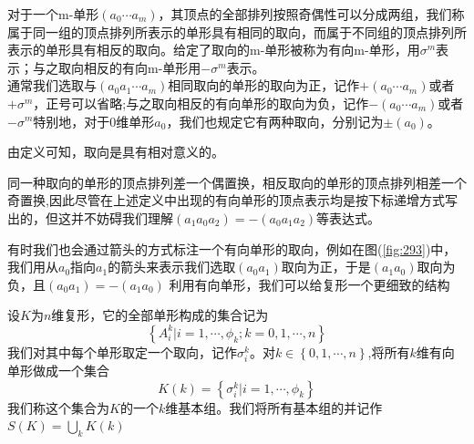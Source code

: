 \begin{figure}[htbp]
\centering
{}
    \caption{}
    \label{fig:332}
\end{figure}
\begin{definition}[有向单形]
对于一个m-单形$(a_{0}\cdots a_{m})$，其顶点的全部排列按照奇偶性可以分成两组，我们称属于同一组的顶点排列所表示的单形具有相同的取向，而属于不同组的顶点排列所表示的单形具有相反的取向。给定了取向的m-单形被称为有向m-单形，用$\sigma^{m}$表示；与之取向相反的有向m-单形用$-\sigma^{m}$表示。\\通常我们选取与$(a_{0}a_{1}\cdots a_{m})$相同取向的单形的取向为正，记作$+(a_{0}\cdots a_{m})$或者$+\sigma^{m}$，正号可以省略;与之取向相反的有向单形的取向为负，记作$-(a_{0}\cdots a_{m})$或者$-\sigma^{m}$特别地，对于0维单形$a_{0}$，我们也规定它有两种取向，分别记为$\pm(a_{0})$。
\end{definition}
\begin{remark}
    由定义可知，取向是具有相对意义的。
\end{remark}
\begin{remark}
    同一种取向的单形的顶点排列差一个偶置换，相反取向的单形的顶点排列相差一个奇置换,因此尽管在上述定义中出现的有向单形的顶点表示均是按下标递增方式写出的，但这并不妨碍我们理解$(a_{1}a_{0}a_{2})=-(a_{0}a_{1}a_{2})$等表达式。
\end{remark}
有时我们也会通过箭头的方式标注一个有向单形的取向，例如在图(\ref{fig:293})中，我们用从$a_{0}$指向$a_{1}$的箭头来表示我们选取$(a_{0}a_{1})$取向为正，于是$(a_{1}a_{0})$取向为负，且$(a_{0}a_{1})=-(a_{1}a_{0})$
利用有向单形，我们可以给复形一个更细致的结构
\begin{definition}
设$K$为$n$维复形，它的全部单形构成的集合记为
\begin{equation*}
    \left\{A^{k}_{i}|i=1,\cdots,\phi_{k};k=0,1,\cdots,n\right\}
\end{equation*}
我们对其中每个单形取定一个取向，记作$\sigma^{k}_{i}$。对$k\in\left\{0,1,\cdots,n\right\}$,将所有$k$维有向单形做成一个集合
\begin{equation*}
    K(k)=\left\{\sigma^{k}_{i}|i=1,\cdots,\phi_{k}\right\}
\end{equation*}
我们称这个集合为$K$的一个$k$维基本组。我们将所有基本组的并记作$S(K)=\bigcup\limits_{k}K(k)$
\end{definition}
